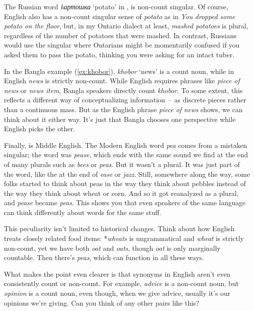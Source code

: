 The Russian word \textit{kартошка} `potato' in , is non-count singular. Of course, English also has a non-count singular sense of \textit{potato} as in \textit{You dropped some potato on the floor}, but, in my Ontario dialect at least, \textit{mashed potatoes} is plural, regardless of the number of potatoes that were mashed. In contrast, Russians would use the singular where Ontarians might be momentarily confused if you asked them to pass the potato, thinking you were asking for an intact tuber.

In the Bangla example (\ref{ex:khobor}), \textit{khobor} `news' is a count noun, while in English \textit{news} is strictly non-count. While English requires phrases like \textit{piece of news} or \textit{news item}, Bangla speakers directly count \textit{khobor}. To some extent, this reflects a different way of conceptualizing information~-- as discrete pieces rather than a continuous mass. But as the English phrase \textit{piece of news} shows, we can think about it either way. It's just that Bangla chooses one perspective while English picks the other.

Finally,  is Middle English. The Modern English word \textit{pea} comes from a mistaken singular; the word was \textit{pease}, which ends with the same  sound we find at the end of many plurals such as \textit{bees} or \textit{peas}. But it wasn't a plural. It was just part of the word, like the  at the end of \textit{ease} or \textit{jazz}. Still, somewhere along the way, some folks started to think about peas in the way they think about pebbles instead of the way they think about wheat or corn. And so it got reanalyzed as a plural, and \textit{pease} became \textit{peas}. This shows you that even speakers of the same language can think differently about words for the same stuff.

This peculiarity isn't limited to historical changes. Think about how English treats closely related food items: *\textit{wheats} is ungrammatical and \textit{wheat} is strictly non-count, yet we have both \textit{oat} and \textit{oats}, though \textit{oat} is only marginally countable. Then there's \textit{peas}, which can function in all these ways.

What makes the point even clearer is that synonyms in English aren't even consistently count or non-count. For example, \textit{advice} is a non-count noun, but \textit{opinion} is a count noun, even though, when we give advice, usually it's our opinions we're giving. Can you think of any other pairs like this?

